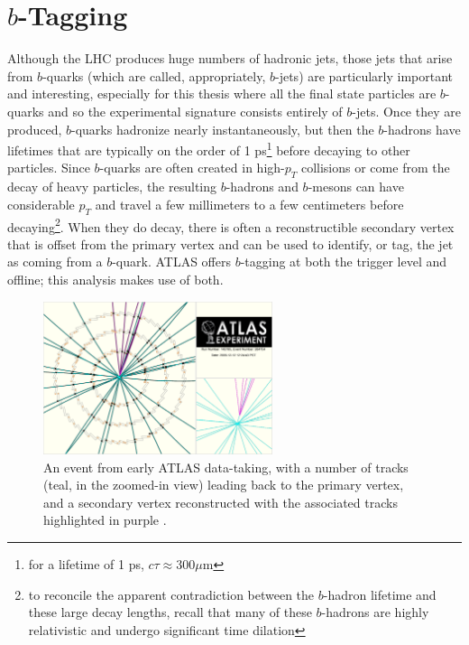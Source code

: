 \section{$b$-Tagging}
\label{sec:b-tag}

Although the LHC produces huge numbers of hadronic jets, those jets that arise from $b$-quarks
(which are called, appropriately, $b$-jets) are particularly important and interesting,
especially for this thesis where all the final state particles are $b$-quarks and so the 
experimental signature consists entirely of $b$-jets.
Once they are produced, $b$-quarks hadronize nearly instantaneously, but then
the $b$-hadrons have lifetimes that are typically on the order of 1 ps\footnote{for a lifetime of 1 ps, $c\tau\approx$300$\mu$m} before
decaying to other particles. 
Since $b$-quarks are often created in high-$p_T$ collisions or come from the decay 
of heavy particles, the resulting $b$-hadrons and $b$-mesons can have considerable $p_T$ and 
travel a few millimeters to a few centimeters before decaying\footnote{to reconcile the 
apparent contradiction between the $b$-hadron lifetime and these large decay lengths, recall
that many of these $b$-hadrons are highly relativistic and undergo significant time dilation}.
When they do decay, there is often a reconstructible secondary vertex that is offset from
the primary vertex and can be used to identify, or tag, the jet as coming from a $b$-quark.  
ATLAS offers $b$-tagging at both the trigger level and offline; this analysis makes use of both.


\begin{figure}
    \center
	\includegraphics[width=0.6\textwidth]{ReconstructionPerformance/images/secondary_vertex.pdf}
	\caption{An event from early ATLAS data-taking, with a number of tracks (teal, in the zoomed-in view) 
    leading back to the primary vertex, and a secondary vertex reconstructed with the associated tracks highlighted in purple \cite{sv}.	\label{fig:secondary_vertex}  }
\end{figure}



